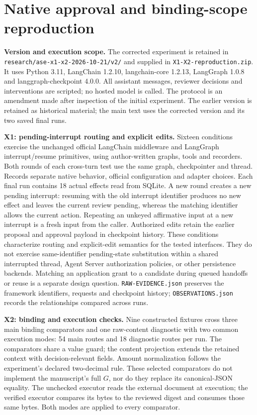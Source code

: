 \section{Native approval and binding-scope reproduction}
\label{sec:a11-native-binding}

\textbf{Version and execution scope.}
The corrected experiment is retained in
\nolinkurl{research/ase-x1-x2-2026-10-21/v2/}
and supplied in \texttt{X1-X2-reproduction.zip}. It uses Python 3.11,
LangChain 1.2.10, langchain-core 1.2.13, LangGraph 1.0.8 and
langgraph-checkpoint 4.0.0. All assistant messages, reviewer decisions
and interventions are scripted; no hosted model is called. The protocol
is an amendment made after inspection of the initial experiment. The
earlier version is retained as historical material; the main text uses
the corrected version and its two saved final runs.

\textbf{X1: pending-interrupt routing and explicit edits.}
Sixteen conditions exercise the unchanged official LangChain middleware
and LangGraph interrupt/resume primitives, using author-written graphs,
tools and recorders. Both rounds of each cross-turn test use the same
graph, checkpointer and thread. Records separate native behavior, official
configuration and adapter choices. Each final run contains 18 actual
effects read from SQLite. A new round creates a new pending interrupt:
resuming with the old interrupt identifier produces no new effect and
leaves the current review pending, whereas the matching identifier
allows the current action. Repeating an unkeyed affirmative input at a
new interrupt is a fresh input from the caller. Authorized edits retain
the earlier proposal and approval payload in checkpoint history.
These conditions characterize routing and explicit-edit semantics for
the tested interfaces. They do not exercise same-identifier pending-state
substitution within a shared interrupted thread, Agent Server
authorization policies, or other persistence backends. Matching an
application grant to a candidate during queued handoffs or reuse is a
separate design question.
\texttt{RAW-EVIDENCE.json} preserves the framework identifiers,
requests and checkpoint history; \texttt{OBSERVATIONS.json} records
the relationships compared across runs.

\textbf{X2: binding and execution checks.}
Nine constructed fixtures cross three main binding comparators and one
raw-content diagnostic with two common execution modes: 54 main routes
and 18 diagnostic routes per run. The comparators share a value guard;
the content projection extends the retained context with decision-relevant
fields. Amount normalization follows the experiment's declared two-decimal
rule. These selected comparators do not implement the manuscript's full
$G$, nor do they replace its canonical-JSON equality.
The unchecked executor reads the external document at execution; the
verified executor compares its bytes to the reviewed digest and consumes
those same bytes. Both modes are applied to every comparator.

